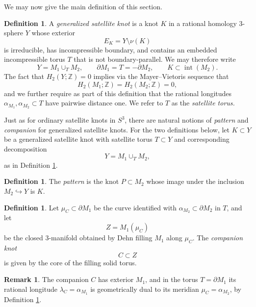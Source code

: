 \documentclass[11pt]{amsart}
\numberwithin{equation}{section}
\numberwithin{theorem}{section}
\theoremstyle{definition}
\newtheorem{definition}[theorem]{Definition}
\newtheorem{remark}[theorem]{Remark}
\newcommand{\Z}{\mathbb{Z}}
\newcommand{\inr}{\operatorname{int}}
\begin{document}
We may now give the main definition of this section.

\begin{definition}\label{def:generalized-satellite}
A \emph{generalized satellite knot} is a knot $K$ in a rational homology 3-sphere $Y$ whose exterior
\[ E_K = Y \setminus \nu(K) \]
is irreducible, has incompressible boundary, and contains an embedded incompressible torus $T$ that is not boundary-parallel.  We may therefore write
\[ Y = M_1 \cup_T M_2, \qquad \partial M_1 = T = -\partial M_2,\qquad K \subset \inr(M_2). \]
The fact that $H_2(Y;\Z)=0$ implies via the Mayer--Vietoris sequence that
\begin{equation} \label{eq:h2-satellite}
H_2(M_1;\Z) = H_2(M_2;\Z) = 0,
\end{equation}
and we further require as part of this definition that the rational longitudes $\alpha_{M_1}, \alpha_{M_2} \subset T$ have pairwise distance one. We  refer to $T$ as the \emph{satellite torus.}
\end{definition}

Just as for ordinary satellite knots in $S^3$, there are  natural notions of \emph{pattern} and \emph{companion} for generalized satellite knots. For the two definitions below, let $K \subset Y$ be a generalized satellite knot with satellite torus $T \subset Y$ and  corresponding decomposition \[Y = M_1\cup_T M_2,\] as in Definition \ref{def:generalized-satellite}. 

\begin{definition} \label{def:generalized-pattern}
The \emph{pattern} is the knot $P \subset M_2$ whose image under the inclusion $M_2 \hookrightarrow Y$ is $K$.
\end{definition}

\begin{definition} \label{def:generalized-companion}
Let $\mu_C \subset \partial M_1$ be the curve identified with $\alpha_{M_2} \subset \partial M_2$ in $T$, and let
\[ Z = M_1(\mu_C) \]
be the closed 3-manifold obtained by Dehn filling $M_1$ along $\mu_C$.  The \emph{companion knot} \[C \subset Z\] is given by the core of the filling solid torus.
\end{definition}

\begin{remark}\label{rmk:dual}
The companion $C$ has exterior $M_1$, and in the torus $T = \partial M_1$ its rational longitude $\lambda_C = \alpha_{M_1}$ is geometrically dual to its meridian $\mu_C = \alpha_{M_2}$, by Definition \ref{def:generalized-satellite}.
\end{remark}
\end{document}
